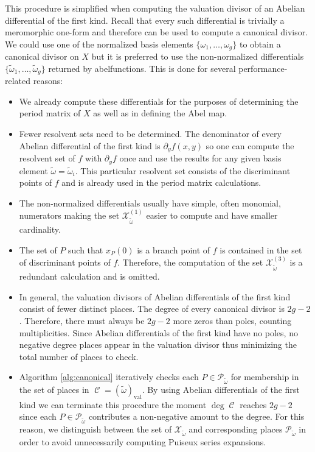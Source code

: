 \documentclass[12pt]{article}
\theoremstyle{definition}
\DeclareMathOperator{\DivC}{\mathcal{C}}
\begin{document}
This procedure is simplified when computing the valuation divisor of an
Abelian differential of the first kind. Recall that every such
differential is trivially a meromorphic one-form and therefore can be
used to compute a canonical divisor. We could use one of the normalized
basis elements $\{\omega_1, \ldots, \omega_g\}$ to obtain a canonical
divisor on $X$ but it is preferred to use the non-normalized
differentials $\{\tilde{\omega}_1, \ldots, \tilde{\omega}_g\}$ returned
by {\sc abelfunctions}. This is done for several performance-related
reasons:
\begin{itemize}
\item We already compute these differentials for the purposes of
  determining the period matrix of $X$ as well as in defining the Abel
  map.
\item Fewer resolvent sets need to be determined. The denominator of
  every Abelian differential of the first kind is $\partial_y f(x,y)$
  \cite{Brieskorn86,Noether83} so one can compute the resolvent set of
  $f$ with $\partial_y f$ once and use the results for any given basis
  element $\tilde{\omega} = \tilde{\omega}_i$. This particular resolvent
  set consists of the discriminant points of $f$ and is already used in
  the period matrix calculations.
\item The non-normalized differentials usually have simple, often
  monomial, numerators making the set
  $\mathcal{X}_{\tilde{\omega}}^{(1)}$ easier to compute and have
  smaller cardinality.
\item The set of $P$ such that $x_P(0)$ is a branch point of $f$ is
  contained in the set of discriminant points of $f$. Therefore, the
  computation of the set $\mathcal{X}_{\tilde{\omega}}^{(3)}$ is a
  redundant calculation and is omitted.
\item In general, the valuation divisors of Abelian differentials of the
  first kind consist of fewer distinct places. The degree of every
  canonical divisor is $2g-2$. Therefore, there must always be $2g-2$
  more zeros than poles, counting multiplicities. Since Abelian
  differentials of the first kind have no poles, no negative degree
  places appear in the valuation divisor thus minimizing the total
  number of places to check.
\item Algorithm \ref{alg:canonical} iteratively checks each $P \in
  \mathcal{P}_{\tilde{\omega}}$ for membership in the set of places in
  $\DivC = (\tilde{\omega})_\text{val}$. By using Abelian differentials
  of the first kind we can terminate this procedure the moment $\deg
  \DivC$ reaches $2g-2$ since each $P\in\mathcal{P}_{\tilde{\omega}}$
  contributes a non-negative amount to the degree. For this reason, we
  distinguish between the set of $\mathcal{X}_{\tilde{\omega}}$ and
  corresponding places $\mathcal{P}_{\tilde{\omega}}$ in order to avoid
  unnecessarily computing Puiseux series expansions.
\end{itemize}
\end{document}
